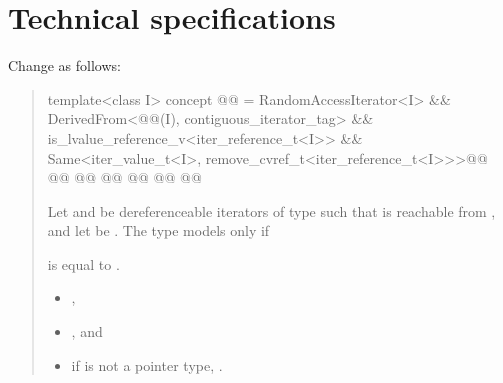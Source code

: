 \chapter{Technical specifications}
Change  as follows:
\begin{quote}
\begin{codeblock}
template<class I>
  concept @@ =
    RandomAccessIterator<I> &&
    DerivedFrom<@@(I), contiguous_iterator_tag> &&
    is_lvalue_reference_v<iter_reference_t<I>> &&
    Same<iter_value_t<I>, remove_cvref_t<iter_reference_t<I>>>@\changed{;}{ \&\&}@
    @@
      @@
    @\added{\} \&\&}@
    @@
      @@
    @\added{\});}@
\end{codeblock}

\setcounter{Paras}{1}
\pnum
Let  and  be dereferenceable iterators  of type 
such that  is reachable from  ,
and let  be .
The type  models  only if
\begin{removedblock}
is equal to
.
\end{removedblock}
\begin{addedblock}
\begin{itemize}
\item {},
\item {}, and
\item if  is not a pointer type, .
\end{itemize}
\end{addedblock}
\end{quote}

